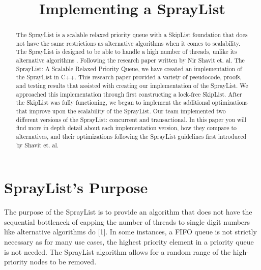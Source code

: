 \documentclass[conference]{IEEEtran}
\begin{document}
\title{Implementing a SprayList}


\author{
\and
{}
\and
{}
}




\maketitle

\begin{abstract}
The SprayList is a scalable relaxed priority queue with a SkipList foundation that does not have the same restrictions as alternative algorithms when it comes to scalability.  The SprayList is designed to be able to handle a high number of threads, unlike its alternative algorithms . Following the research paper written by Nir Shavit et. al. The SprayList: A Scalable Relaxed Priority Queue, we have created an implementation of the SprayList in C++. This research paper provided a variety of pseudocode, proofs, and testing results that assisted with creating our implementation of the SprayList. We approached this implementation through first constructing a lock-free SkipList. After the SkipList was fully functioning, we began to implement the additional optimizations that improve upon the scalability of the SprayList. Our team implemented two different versions of the SprayList: concurrent and transactional. In this paper you will find more in depth detail about each implementation version, how they compare to alternatives, and their optimizations following the SprayList guidelines first introduced by Shavit et. al.
\end{abstract}

\IEEEpeerreviewmaketitle



\section{SprayList’s Purpose}

The purpose of the SprayList is to provide an algorithm that does not have the sequential bottleneck of capping the number of threads to single digit numbers like alternative algorithms do [1]. In some instances, a FIFO queue is not strictly necessary as for many use cases, the highest priority element in a priority queue is not needed. The SprayList algorithm allows for a random range of the high-priority nodes to be removed.
\end{document}
